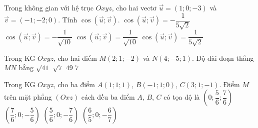 \begin{ex}%
	Trong không gian với hệ trục $Oxyz$, cho hai vectơ $\overrightarrow{u}=(1;0;-3)$ và $\overrightarrow{v}=(-1;-2;0)$. Tính $\cos\left( \overrightarrow{u};\overrightarrow{v}\right) $.
	\choice
	{\True $\cos\left( \overrightarrow{u};\overrightarrow{v}\right) =-\dfrac{1}{5\sqrt{2}}$}
	{$\cos\left( \overrightarrow{u};\overrightarrow{v}\right) =-\dfrac{1}{\sqrt{10}}$}
	{$\cos\left( \overrightarrow{u};\overrightarrow{v}\right) =\dfrac{1}{\sqrt{10}}$}
	{$\cos\left( \overrightarrow{u};\overrightarrow{v}\right) =\dfrac{1}{5\sqrt{2}}$}
\end{ex}
\begin{ex}%
	Trong KG $Oxyz$, cho hai điểm $M(2;1;-2)$ và $N(4;-5;1)$. Độ dài đoạn thẳng $MN$ bằng
	\choice
	{$\sqrt{41}$}
	{$\sqrt{7}$}
	{$49$}
	{\True $7$}
\end{ex}
\begin{ex}%
	Trong KG $Oxyz$, cho ba điểm $A(1;1;1 )$, $B(-1;1;0 )$, $C(3;1;-1 )$. Điểm $M$ trên mặt phẳng $(Oxz )$ cách đều ba điểm $A$, $B$, $C$ có tọa độ là
	\choice 
	{ $\left(0;\dfrac{5}{6};\dfrac{7}{6} \right)$}
	{ $\left(\dfrac{7}{6};0;-\dfrac{5}{6} \right)$}
	{ \True $\left(\dfrac{5}{6};0;-\dfrac{7}{6} \right)$}
	{ $\left(\dfrac{6}{5};0;-\dfrac{6}{7} \right)$} 
\end{ex}
